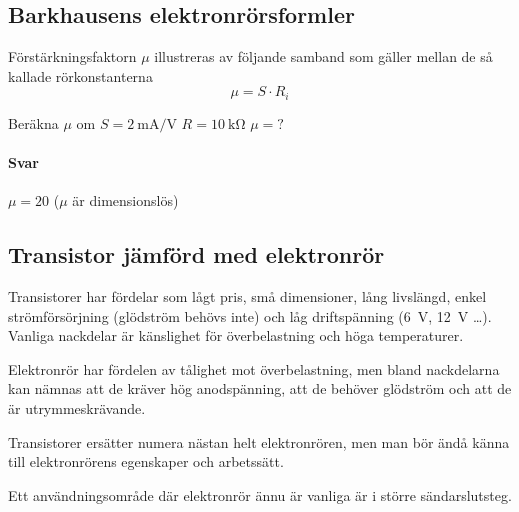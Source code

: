 \subsection{Barkhausens elektronrörsformler}

Förstärkningsfaktorn \(\mu \) illustreras av följande samband som gäller mellan
de så kallade rörkonstanterna
\[\mu = S \cdot R_i\]
\begin{exempelbox}
Beräkna \(\mu\)  om \(S = \qty{2}{\milli\ampere\per\volt}\) \(R = \qty{10}{\kilo\ohm}\) \(\mu = ?\)
\tcblower
\paragraph{Svar} \(\mu = 20\) (\(\mu\)  är dimensionslös)
\end{exempelbox}

\subsection{Transistor jämförd med elektronrör}

Transistorer har fördelar som lågt pris, små dimensioner, lång livslängd, enkel
strömförsörjning (glödström behövs inte) och låg driftspänning (\qty{6}{\volt},
\qty{12}{\volt} \ldots ).
Vanliga nackdelar är känslighet för överbelastning och höga temperaturer.

Elektronrör har fördelen av tålighet mot överbelastning, men bland nackdelarna
kan nämnas att de kräver hög anodspänning, att de behöver glödström och att de
är utrymmeskrävande.

Transistorer ersätter numera nästan helt elektronrören, men man bör ändå känna
till elektronrörens egenskaper och arbetssätt.

Ett användningsområde där elektronrör ännu är vanliga är i större
sändarslutsteg.
